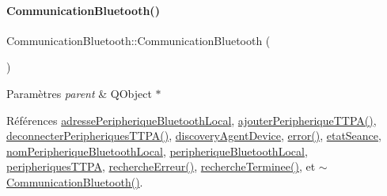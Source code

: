 \paragraph{\texorpdfstring{Communication\+Bluetooth()}{CommunicationBluetooth()}\hspace{0.1cm}{\footnotesize\ttfamily [2/2]}}
{\footnotesize\ttfamily Communication\+Bluetooth\+::\+Communication\+Bluetooth (\begin{DoxyParamCaption}{ }\end{DoxyParamCaption})}


\begin{DoxyParams}{Paramètres}
{\em parent} & Q\+Object $\ast$ \\
\hline
\end{DoxyParams}


Références \hyperlink{class_communication_bluetooth_a972265a71842606740b53560a7fc0e53}{adresse\+Peripherique\+Bluetooth\+Local}, \hyperlink{class_communication_bluetooth_a53bc4772892ec57f030600e49fa0b6ff}{ajouter\+Peripherique\+T\+T\+P\+A()}, \hyperlink{class_communication_bluetooth_aacfffa47d72f3ab5ab554001d5f38fd1}{deconnecter\+Peripheriques\+T\+T\+P\+A()}, \hyperlink{class_communication_bluetooth_a9e04dbd88ba090525d6691cc1a4237b6}{discovery\+Agent\+Device}, \hyperlink{class_communication_bluetooth_a6e0d7054012e11af9d55d6d4f5764259}{error()}, \hyperlink{class_communication_bluetooth_adc66f3034d46f3964a26b62ad98e784f}{etat\+Seance}, \hyperlink{class_communication_bluetooth_a6781eed73c4b5db0fe7ff94c034f2cf5}{nom\+Peripherique\+Bluetooth\+Local}, \hyperlink{class_communication_bluetooth_a03c857db65a9ea5a0b944844f675e6fa}{peripherique\+Bluetooth\+Local}, \hyperlink{class_communication_bluetooth_a656a80f8216d2a4db7cf2f865365e562}{peripheriques\+T\+T\+PA}, \hyperlink{class_communication_bluetooth_ad9abca9e2e3fa0115cc92458a357e04d}{recherche\+Erreur()}, \hyperlink{class_communication_bluetooth_a79ee5a5bcaaf265048f1213b5504f146}{recherche\+Terminee()}, et \hyperlink{class_communication_bluetooth_a13c72d24359f40c204e94f3ef1ab6fd3}{$\sim$\+Communication\+Bluetooth()}.


